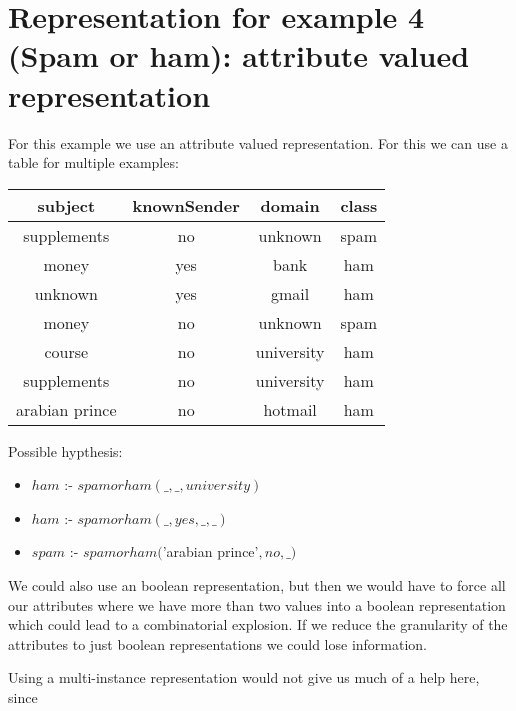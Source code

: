 \documentclass[a4paper]{article}
\begin{document}
\section{Representation for example 4 (Spam or ham): attribute valued representation}
For this example we use an attribute valued representation. For this we can use a table for multiple examples:

\begin{tabular}{c|c|c||c}
	subject & knownSender & domain & class \\
	\hline
	supplements & no & unknown & spam \\
	money & yes & bank & ham \\
	unknown & yes & gmail & ham \\
	money & no & unknown & spam \\
	course & no & university & ham \\
	supplements & no & university & ham \\
	arabian prince & no & hotmail & ham \\

\end{tabular}


Possible hypthesis:
\begin{itemize}
\item $ham$ :- $spamorham(\_, \_, university) $
\item $ham$ :- $spamorham(\_, yes, \_, \_)$
\item $spam$ :- $spamorham($'arabian prince'$, no, \_)$
\end{itemize}

We could also use an boolean representation, but then we would have to force all our attributes where we have more than two values into a boolean representation which could lead to a combinatorial explosion. If we reduce the granularity of the attributes to just boolean representations we could lose information.

Using a multi-instance representation would not give us much of a help here, since
\end{document}
